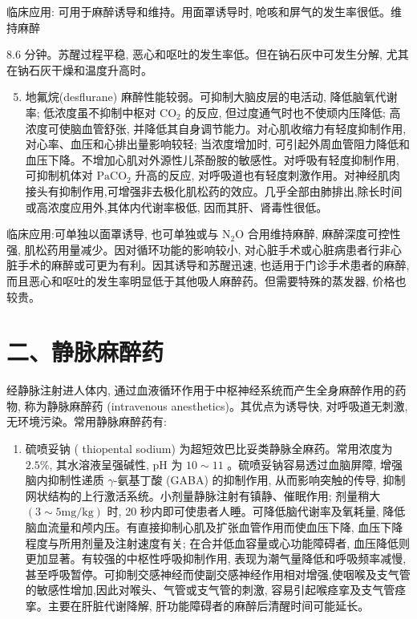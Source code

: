 \documentclass[10pt]{article}
\begin{document}
临床应用: 可用于麻醉诱导和维持。用面罩诱导时, 呛咳和屏气的发生率很低。维持麻醉

8.6 分钟。苏醒过程平稳, 恶心和呕吐的发生率低。但在钠石灰中可发生分解, 尤其在钠石灰干燥和温度升高时。

\begin{enumerate}
  \setcounter{enumi}{4}
  \item 地氟烷(desflurane) 麻醉性能较弱。可抑制大脑皮层的电活动, 降低脑氧代谢率; 低浓度虽不抑制中枢对 $\mathrm{CO}_{2}$ 的反应, 但过度通气时也不使顽内压降低; 高浓度可使脑血管舒张, 并降低其自身调节能力。对心肌收缩力有轻度抑制作用, 对心率、血压和心排出量影响较轻; 当浓度增加时, 可引起外周血管阻力降低和血压下降。不增加心肌对外源性儿茶酚胺的敏感性。对呼吸有轻度抑制作用, 可抑制机体对 $\mathrm{PaCO}_{2}$ 升高的反应, 对呼吸道也有轻度刺激作用。对神经肌肉接头有抑制作用,可增强非去极化肌松药的效应。几乎全部由肺排出,除长时间或高浓度应用外,其体内代谢率极低, 因而其肝、肾毒性很低。
\end{enumerate}

临床应用:可单独以面罩诱导, 也可单独或与 $\mathrm{N}_{2} \mathrm{O}$ 合用维持麻醉, 麻醉深度可控性强, 肌松药用量减少。因对循环功能的影响较小, 对心脏手术或心脏病患者行非心脏手术的麻醉或可更为有利。因其诱导和苏醒迅速, 也适用于门诊手术患者的麻醉, 而且恶心和呕吐的发生率明显低于其他吸人麻醉药。但需要特殊的蒸发器, 价格也较贵。

\section*{二、静脉麻醉药}
经静脉注射进人体内, 通过血液循环作用于中枢神经系统而产生全身麻醉作用的药物, 称为静脉麻醉药 (intravenous anesthetics)。其优点为诱导快, 对呼吸道无刺激, 无环境污染。常用静脉麻醉药有:

\begin{enumerate}
  \item 硫喷妥钠 ( thiopental sodium) 为超短效巴比妥类静脉全麻药。常用浓度为 $2.5 \%$, 其水溶液呈强碱性, $\mathrm{pH}$ 为 $10 \sim 11$ 。硫喷妥钠容易透过血脑屏障, 增强脑内抑制性递质 $\gamma$-氨基丁酸 (GABA) 的抑制作用, 从而影响突触的传导, 抑制网状结构的上行激活系统。小剂量静脉注射有镇静、催眠作用; 剂量稍大 $(3 \sim 5 \mathrm{mg} / \mathrm{kg})$ 时, 20 秒内即可使患者人睡。可降低脑代谢率及氧耗量, 降低脑血流量和颅内压。有直接抑制心肌及扩张血管作用而使血压下降, 血压下降程度与所用剂量及注射速度有关; 在合并低血容量或心功能障碍者, 血压降低则更加显著。有较强的中枢性呼吸抑制作用, 表现为潮气量降低和呼吸频率减慢, 甚至呼吸暂停。可抑制交感神经而使副交感神经作用相对增强,使咽喉及支气管的敏感性增加,因此对喉头、气管或支气管的刺激, 容易引起喉痉挛及支气管痉挛。主要在肝脏代谢降解, 肝功能障碍者的麻醉后清醒时间可能延长。
\end{enumerate}
\end{document}
